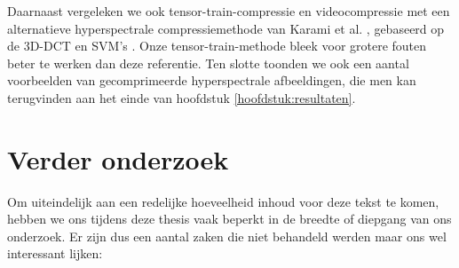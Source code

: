 Daarnaast vergeleken we ook tensor-train-compressie en videocompressie met een alternatieve hyperspectrale compressiemethode van Karami et al. \cite{ref:karami}, gebaseerd op de 3D-DCT \cite{ref:dct} en SVM's \cite{ref:svm}. Onze tensor-train-methode bleek voor grotere fouten beter te werken dan deze referentie. Ten slotte toonden we ook een aantal voorbeelden van gecomprimeerde hyperspectrale afbeeldingen, die men kan terugvinden aan het einde van hoofdstuk \ref{hoofdstuk:resultaten}.

\newpage
\section{Verder onderzoek}

Om uiteindelijk aan een redelijke hoeveelheid inhoud voor deze tekst te komen, hebben we ons tijdens deze thesis vaak beperkt in de breedte of diepgang van ons onderzoek. Er zijn dus een aantal zaken die niet behandeld werden maar ons wel interessant lijken:

